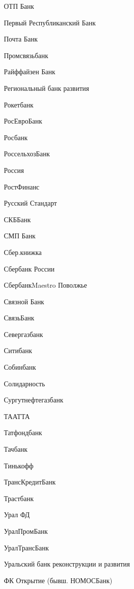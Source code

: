 \documentclass[a4paper,10pt,russian]{sphinxmanual}
\begin{document}
\sphinxAtStartPar
ОТП Банк

\sphinxAtStartPar
Первый Республиканский Банк

\sphinxAtStartPar
Почта Банк

\sphinxAtStartPar
Промсвязьбанк

\sphinxAtStartPar
Райффайзен Банк

\sphinxAtStartPar
Региональный банк развития

\sphinxAtStartPar
Рокетбанк

\sphinxAtStartPar
РосЕвроБанк

\sphinxAtStartPar
Росбанк

\sphinxAtStartPar
РоссельхозБанк

\sphinxAtStartPar
Россия

\sphinxAtStartPar
РостФинанс

\sphinxAtStartPar
Русский Стандарт

\sphinxAtStartPar
СКБ\sphinxhyphen{}Банк

\sphinxAtStartPar
СМП Банк

\sphinxAtStartPar
Сбер.книжка

\sphinxAtStartPar
Сбербанк России

\sphinxAtStartPar
Сбербанк\sphinxhyphen{}Maestro Поволжье

\sphinxAtStartPar
Связной Банк

\sphinxAtStartPar
Связь\sphinxhyphen{}Банк

\sphinxAtStartPar
Севергазбанк

\sphinxAtStartPar
Ситибанк

\sphinxAtStartPar
Собинбанк

\sphinxAtStartPar
Солидарность

\sphinxAtStartPar
Сургутнефтегазбанк

\sphinxAtStartPar
ТААТТА

\sphinxAtStartPar
Татфондбанк

\sphinxAtStartPar
Тачбанк

\sphinxAtStartPar
Тинькофф

\sphinxAtStartPar
ТрансКредитБанк

\sphinxAtStartPar
Трастбанк

\sphinxAtStartPar
Урал ФД

\sphinxAtStartPar
УралПромБанк

\sphinxAtStartPar
УралТрансБанк

\sphinxAtStartPar
Уральский банк реконструкции и развития

\sphinxAtStartPar
ФК Открытие (бывш. НОМОС\sphinxhyphen{}Банк)
\end{document}
